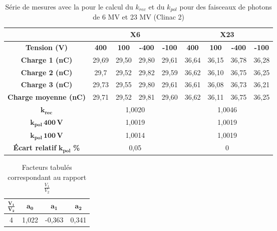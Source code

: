 \documentclass{article}
\begin{document}
\begin{table}[h]
  \centering
  \begin{tabular}{c|cccc|cccc|}
  \cline{2-9}
                                                     & \multicolumn{4}{c|}{\textbf{X6}} & \multicolumn{4}{c|}{\textbf{X23}} \\ \hline
  \multicolumn{1}{|c|}{\textbf{Tension (V)}} & \textbf{400} & \textbf{100} & \textbf{-400} & \textbf{-100} & \textbf{400} & \textbf{100} & \textbf{-400} & \textbf{-100} \\ \hline
  \multicolumn{1}{|c|}{\textbf{Charge 1 (nC)}}       & 29,69  & 29,50  & 29,80  & 29,61 & 36,64  & 36,15  & 36,78  & 36,28  \\
  \multicolumn{1}{|c|}{\textbf{Charge 2 (nC)}}       & 29,7   & 29,52  & 29,82  & 29,59 & 36,62  & 36,10  & 36,75  & 36,25  \\
  \multicolumn{1}{|c|}{\textbf{Charge 3 (nC)}}       & 29,73  & 29,55  & 29,80  & 29,61 & 36,61  & 36,08  & 36,73  & 36,21  \\
  \multicolumn{1}{|c|}{\textbf{Charge moyenne (nC)}} & 29,71  & 29,52  & 29,81  & 29,60 & 36,62  & 36,11  & 36,75  & 36,25  \\ \hline
  \multicolumn{1}{|c|}{$\mathbf{k_{rec}}$}                & \multicolumn{4}{c|}{1,0020}      & \multicolumn{4}{c|}{1,0046}       \\
  \multicolumn{1}{|c|}{$\mathbf{k_{pol} \, 400 \, V}$}          & \multicolumn{4}{c|}{1,0019}      & \multicolumn{4}{c|}{1,0019}       \\
  \multicolumn{1}{|c|}{$\mathbf{k_{pol} \, 100 \, V}$}          & \multicolumn{4}{c|}{1,0014}      & \multicolumn{4}{c|}{1,0019}       \\ 
  \multicolumn{1}{|c|}{\textbf{Écart relatif} $\mathbf{k_{pol}}$ \textbf{\%}} & \multicolumn{4}{c|}{0,05} & \multicolumn{4}{c|}{0} \\
  \hline
  \end{tabular}
  \caption{Série de mesures avec la  pour le calcul du $k_{rec}$ et du $k_{pol}$ pour des faisceaux de photons de 6 MV et 23 MV (Clinac 2)}
  \label{table_kpol}
\end{table}



\begin{table}[h]
  \centering
  \begin{tabular}{cccc}
    \toprule
    $\mathbf{\frac{V_1}{V_2}}$ & $\mathbf{a_0}$ & $\mathbf{a_1}$ & $\mathbf{a_2}$\\
    \toprule
    4 & 1,022 & -0,363 & 0,341\\
    \bottomrule    
  \end{tabular}
  \caption{Facteurs tabulés correspondant au rapport $\frac{V_1}{V_2}$}
  \label{table_facteurs_krec}
\end{table}
\end{document}
